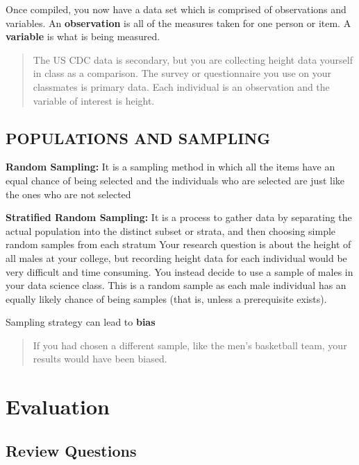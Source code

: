 \documentclass[
]{book}
\begin{document}
Once compiled, you now have a data set which is comprised of
observations and variables. An \textbf{observation} is all of the
measures taken for one person or item. A \textbf{variable} is what is
being measured.

\begin{quote}
The US CDC data is secondary, but you are collecting height
data yourself in class as a comparison. The survey or
questionnaire you use on your classmates is primary data. Each
individual is an observation and the variable of interest is
height.
\end{quote}

\hypertarget{populations-and-sampling}{%
\subsection{POPULATIONS AND SAMPLING}\label{populations-and-sampling}}

\textbf{Random Sampling:} It is a sampling method in which all the
items have an equal chance of being selected and the individuals
who are selected are just like the ones who are not selected

\textbf{Stratified Random Sampling:} It is a process to gather data by
separating the actual population into the distinct subset or
strata, and then choosing simple random samples from each stratum
Your research question is about the height of all males at your
college, but recording height data for each individual would be
very difficult and time consuming. You instead decide to use a
sample of males in your data science class. This is a random
sample as each male individual has an equally likely chance of
being samples (that is, unless a prerequisite exists).

Sampling strategy can lead to \textbf{bias}

\begin{quote}
If you had chosen a different sample, like the men's basketball
team, your results would have been biased.
\end{quote}

\hypertarget{evaluation}{%
\section{Evaluation}\label{evaluation}}

\hypertarget{review-questions}{%
\subsection{Review Questions}\label{review-questions}}
\end{document}
